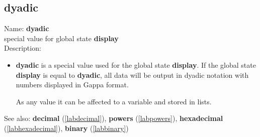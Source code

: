 \subsection{dyadic}
\label{labdyadic}
\noindent Name: \textbf{dyadic}\\
special value for global state \textbf{display}\\
\noindent Description: \begin{itemize}

\item \textbf{dyadic} is a special value used for the global state \textbf{display}.
   If the global state \textbf{display} is equal to \textbf{dyadic}, all data will
   be output in dyadic notation with numbers displayed in Gappa format.
    
   As any value it can be affected to a variable and stored in lists.
\end{itemize}
See also: \textbf{decimal} (\ref{labdecimal}), \textbf{powers} (\ref{labpowers}), \textbf{hexadecimal} (\ref{labhexadecimal}), \textbf{binary} (\ref{labbinary})
